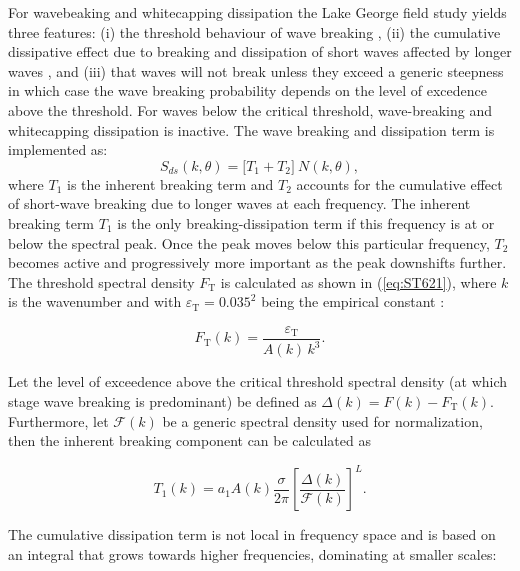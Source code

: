 For wavebeaking and whitecapping dissipation the Lake George field 
study yields three features: (i) the threshold behaviour of wave 
breaking \citep{art:BBY00,art:BGM02}, (ii) the cumulative dissipative 
effect due to breaking and dissipation of short waves affected 
by longer waves \citep{pro:Don01,pro:BY05,art:YB06b,art:BTYW10},
and (iii) that waves will not break unless they exceed a generic
steepness in which case the wave breaking probability depends on 
the level of excedence above the threshold.
For waves below the critical threshold, wave-breaking and whitecapping 
dissipation is inactive. The wave breaking and dissipation term is
implemented as:
\begin{equation}\label{eq:ST620}
  S_{ds}(k,\theta) = \bigl [ T_1 + T_2 \bigr ]\ N(k,\theta),
\end{equation}
where $T_1$ is the inherent breaking term and $T_2$ 
accounts for the cumulative effect of short-wave breaking
due to longer waves at each frequency. The inherent breaking 
term $T_1$ is the only breaking-dissipation term if this frequency 
is at or below the spectral peak. Once the peak moves 
below this particular frequency, $T_2$ becomes active
and progressively more important as the peak downshifts
further.\\

The threshold spectral density $F_{\mathrm{T}}$ is 
calculated as shown in (\ref{eq:ST621}), where $k$ is 
the wavenumber and with $\varepsilon_{\mathrm{T}}=0.035^2$ 
being the empirical constant \citep{art:BBYD07}:

\begin{equation}\label{eq:ST621}
  F_{\mathrm{T}}(k)=\frac{\varepsilon_{\mathrm{T}}}{A(k)\,k^3}.
\end{equation}

Let the level of exceedence above the critical threshold spectral
density (at which stage wave breaking is predominant) be defined as 
$\Delta(k)=F(k)-F_{\mathrm{T}}(k)$. Furthermore, let
$\mathcal{F}(k)$ be a generic spectral density used for 
normalization, then the inherent breaking component can 
be calculated as

\begin{equation}\label{eq:ST622}
T_1(k)=a_1 A(k)\frac{\sigma}{2\pi} \left [ \frac{\Delta(k)}{\mathcal{F}(k)} \right ]^L\!\!.
\end{equation}

The cumulative dissipation term is not local in frequency space and is 
based on an integral that grows towards higher frequencies, dominating at 
smaller scales:

